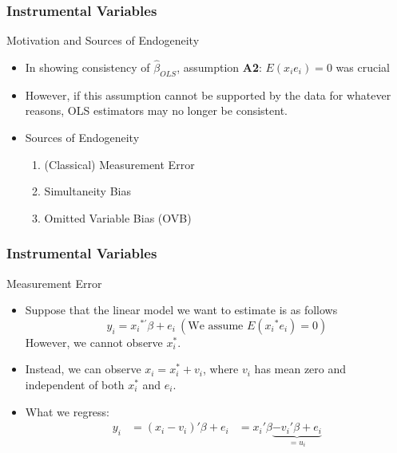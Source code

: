 \documentclass{beamer}
\begin{document}
\begin{frame}
\frametitle{Instrumental Variables}
Motivation and Sources of Endogeneity
\begin{itemize}
\item In showing consistency of $\hat{\beta}_{OLS}$, assumption \textbf{A2}: $E(x_ie_i)=0$ was crucial
\item However, if this assumption cannot be supported by the data for whatever reasons, OLS estimators may no longer be consistent.
\item Sources of Endogeneity
\begin{enumerate}
\item (Classical) Measurement Error
\item Simultaneity Bias
\item Omitted Variable Bias (OVB)
\end{enumerate}
\end{itemize}
\end{frame}

\begin{frame}
\frametitle{Instrumental Variables}
Measurement Error
\begin{itemize}
\item Suppose that the linear model we want to estimate is as follows
\[
y_i = {x_i}^{*'}\beta+e_i \ (\text{We assume }E({x_i}^{*}e_i)=0)
\]
However, we cannot observe $x_i^*$.
\item Instead, we can observe $x_i=x_i^*+v_i$, where $v_i$ has mean zero and independent of both $x_i^*$ and $e_i$.
\item What we regress:
\[
\begin{aligned}
y_i &= (x_i-v_i)'\beta+e_i &=x_i'\beta \underbrace{-v_i'\beta+e_i}_{=u_i} \\
\end{aligned}
\]
\end{itemize}
\end{frame}
\end{document}
